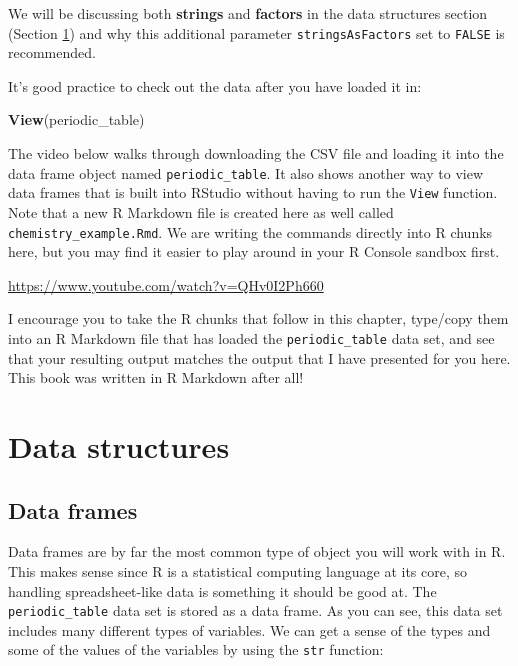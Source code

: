 \documentclass[]{tufte-book}
\newenvironment{Shaded}{\begin{snugshade}}{\end{snugshade}}
\newcommand{\FunctionTok}[1]{\textcolor[rgb]{0.13,0.29,0.53}{\textbf{#1}}}
\newcommand{\NormalTok}[1]{#1}
\begin{document}
We will be discussing both \textbf{strings} and \textbf{factors} in the data structures section (Section \ref{data-structures}) and why this additional parameter \texttt{stringsAsFactors} set to \texttt{FALSE} is recommended.

It's good practice to check out the data after you have loaded it in:

\begin{Shaded}
\begin{Highlighting}[]
\FunctionTok{View}\NormalTok{(periodic\_table)}
\end{Highlighting}
\end{Shaded}

The video below walks through downloading the CSV file and loading it into the data frame object named \texttt{periodic\_table}. It also shows another way to view data frames that is built into RStudio without having to run the \texttt{View} function. Note that a new R Markdown file is created here as well called \texttt{chemistry\_example.Rmd}. We are writing the commands directly into R chunks here, but you may find it easier to play around in your R Console sandbox first.

\vspace{0.1in}\begin{center}\footnotesize{\url{https://www.youtube.com/watch?v=QHv0I2Ph660}}\end{center}\vspace{0.1in}

I encourage you to take the R chunks that follow in this chapter, type/copy them into an R Markdown file that has loaded the \texttt{periodic\_table} data set, and see that your resulting output matches the output that I have presented for you here. This book was written in R Markdown after all!

\section{Data structures}\label{data-structures}

\subsection{Data frames}\label{data-frames}

Data frames are by far the most common type of object you will work with in R. This makes sense since R is a statistical computing language at its core, so handling spreadsheet-like data is something it should be good at. The \texttt{periodic\_table} data set is stored as a data frame. As you can see, this data set includes many different types of variables. We can get a sense of the types and some of the values of the variables by using the \texttt{str} function:
\end{document}
